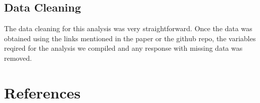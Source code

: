 \documentclass[
  letterpaper,
  DIV=11,
  numbers=noendperiod]{scrartcl}
\begin{document}
\subsection{Data Cleaning}\label{data-cleaning}

The data cleaning for this analysis was very straightforward. Once the
data was obtained using the links mentioned in the paper or the github
repo, the variables reqired for the analysis we compiled and any
response with missing data was removed.

\newpage

\section*{References}\label{references}
\end{document}
